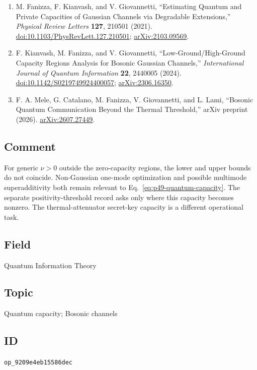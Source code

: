 \begin{enumerate}[label={},leftmargin=4.8em,labelsep=0.5em]
  \item[\textup{[FKG21]}]\label{ref:p49-fanizza-kianvash-giovannetti}
  M. Fanizza, F. Kianvash, and V. Giovannetti,
  ``Estimating Quantum and Private Capacities of Gaussian Channels via
  Degradable Extensions,''
  \emph{Physical Review Letters} \textbf{127}, 210501 (2021).
  \href{https://doi.org/10.1103/PhysRevLett.127.210501}{doi:10.1103/PhysRevLett.127.210501};
  \href{https://arxiv.org/abs/2103.09569}{arXiv:2103.09569}.

  \item[\textup{[KFG24]}]\label{ref:p49-kianvash-fanizza-giovannetti}
  F. Kianvash, M. Fanizza, and V. Giovannetti,
  ``Low-Ground/High-Ground Capacity Regions Analysis for Bosonic Gaussian
  Channels,''
  \emph{International Journal of Quantum Information} \textbf{22}, 2440005
  (2024).
  \href{https://doi.org/10.1142/S0219749924400057}{doi:10.1142/S0219749924400057};
  \href{https://arxiv.org/abs/2306.16350}{arXiv:2306.16350}.

  \item[\textup{[MCF+26]}]\label{ref:p49-mele-et-al}
  F. A. Mele, G. Catalano, M. Fanizza, V. Giovannetti, and L. Lami,
  ``Bosonic Quantum Communication Beyond the Thermal Threshold,''
  arXiv preprint (2026).
  \href{https://arxiv.org/abs/2607.27449}{arXiv:2607.27449}.
\end{enumerate}

\subsection*{Comment}

For generic $\nu>0$ outside the zero-capacity regions, the lower and upper
bounds do not coincide.  Non-Gaussian one-mode optimization and possible
multimode superadditivity both remain relevant to
Eq.~\eqref{eq:p49-quantum-capacity}. The separate positivity-threshold record asks only where this capacity becomes nonzero. The thermal-attenuator secret-key capacity is a different operational task.

\subsection*{Field}

Quantum Information Theory

\subsection*{Topic}

Quantum capacity; Bosonic channels

\subsection*{ID}

\texttt{op\_9209e4eb15586dec}
